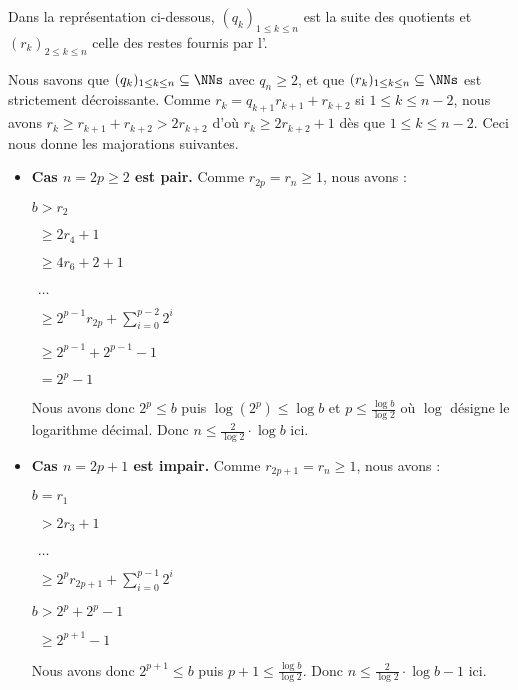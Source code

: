 Dans la représentation ci-dessous, $(q_k)_{1 \leq k \leq n}$ est la suite des quotients et $(r_k)_{2 \leq k \leq n}$ celle des restes fournis par l'\algoeucl.



\medskip


Nous savons que $(q_k)_{1 \leq k \leq n} \subseteq \NNs$ avec $q_n \geq 2$, et que $(r_k)_{1 \leq k \leq n} \subseteq \NNs$ est strictement décroissante.
Comme $r_k = q_{k+1} r_{k+1} + r_{k+2}$ si $1 \leq k \leq n-2$, nous avons $r_k \geq r_{k+1} + r_{k+2} > 2 r_{k+2}$ d'où $r_k \geq 2 r_{k+2} + 1$ dès que $1 \leq k \leq n-2$.
Ceci nous donne les majorations suivantes.

\begin{itemize}[label=\small\textbullet]
	\item \textbf{Cas $n = 2p \geq 2$ est pair.}
	      Comme $r_{2p} = r_n \geq 1$, nous avons :
	      
	      \noindent
	      $b > r_2$
	      
	      \noindent
	      $\phantom{b} \geq 2 r_4 + 1$
	      
	      \noindent
	      $\phantom{b} \geq 4 r_6 + 2 + 1$
	      
	      \noindent
	      $\phantom{b} \dots$
	      
	      \noindent
	      $\phantom{b} \geq 2^{p-1} r_{2p} + \displaystyle \sum_{i=0}^{p-2} 2^i$
	      
	      \noindent
	      $\phantom{b} \geq 2^{p-1} + 2^{p-1} - 1$
	      
	      \noindent
	      $\phantom{b} = 2^p - 1$
	      
	      \noindent
	      Nous avons donc $2^p \leq b$ puis $\log(2^p) \leq \log b$ et $p \leq \frac{\log b}{\log 2}$ où $\log$ désigne le logarithme décimal.
	      Donc $n \leq \frac{2}{\log 2} \cdot \log b$ ici.


	\item \textbf{Cas $n = 2p+1$ est impair.}
	      Comme $r_{2p+1} = r_n \geq 1$, nous avons :
	      	       
	      \noindent
	      $b = r_1$
	      	       
	      \noindent
	      $\phantom{b} > 2 r_3 + 1$
	      	       
	      \noindent
	      $\phantom{b} \dots$
	      	       
	      \noindent
	      $\phantom{b} \geq 2^p r_{2p+1} + \displaystyle \sum_{i=0}^{p-1} 2^i$
	      	       
	      \noindent
	      $b > 2^p + 2^p - 1$
	      	       
	      \noindent
	      $\phantom{b} \geq 2^{p + 1} - 1$
	      
	      \noindent
	      Nous avons donc $2^{p + 1} \leq b$ puis $p + 1 \leq \frac{\log b}{\log 2}$.
	      Donc $n \leq \frac{2}{\log 2} \cdot \log b - 1$ ici.
\end{itemize}



